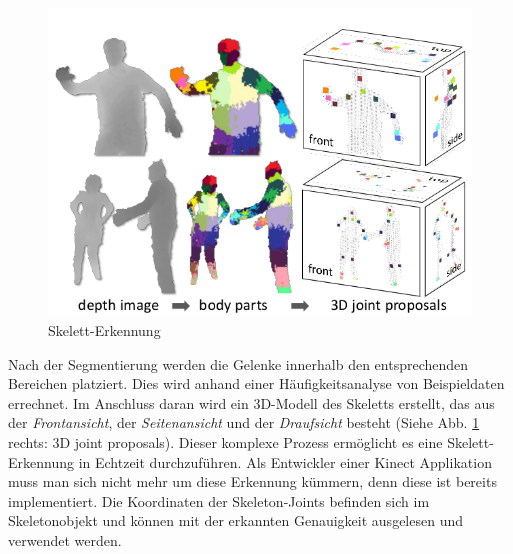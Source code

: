 \begin{figure}[H]						
	\centering							
	\includegraphics[scale=0.5]{Bilder/kinect_body_parts.png}			
	\caption{Skelett-Erkennung \cite{pdf:realtime_human_pose}}						
	\label{f:kinect_skeleton}						
\end{figure}
\noindent
Nach der Segmentierung werden die Gelenke innerhalb den entsprechenden Bereichen platziert. Dies wird anhand einer Häufigkeitsanalyse von Beispieldaten errechnet.
Im Anschluss daran wird ein 3D-Modell des Skeletts erstellt, das aus der \textit{Frontansicht}, der \textit{Seitenansicht} und der \textit{Draufsicht} besteht (Siehe Abb. \ref{f:kinect_skeleton} rechts: 3D joint proposals).
Dieser komplexe Prozess ermöglicht es eine Skelett-Erkennung in Echtzeit durchzuführen. Als Entwickler einer Kinect Applikation muss man sich nicht mehr um diese Erkennung kümmern, denn diese  ist bereits implementiert.
Die Koordinaten der Skeleton-Joints befinden sich im Skeletonobjekt und können mit der erkannten Genauigkeit ausgelesen und verwendet werden.


